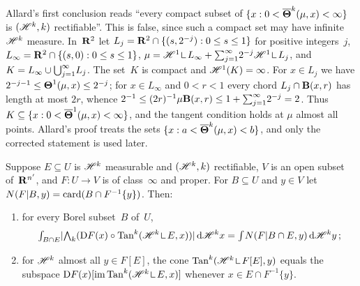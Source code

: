 \begin{remark}
    \label{rem:2.8(5)}
    Allard's first conclusion reads ``every compact subset of $\{ x : 0 < \boldsymbol{\overline{\Theta}}^{k}(\mu,x)
    < \infty \}$ is $(\mathscr{H}^{k},k)$ rectifiable''. This is false, since such a compact set
    may have infinite $\mathscr{H}^{k}$ measure. In~$\mathbf{R}^2$ let $L_j = \mathbf{R}^2 \cap \{ (s, 2^{-j}) : 0
    \le s \le 1 \}$ for positive integers~$j$, $L_\infty = \mathbf{R}^2 \cap \{ (s,0) : 0 \le s \le 1 \}$,
    $\mu = \HM^1 \restrict L_\infty + \textsum{j=1}{\infty} 2^{-j} \HM^1 \restrict L_j$, and $K =
    L_\infty \cup {{\textstyle \bigcup}}_{j=1}^\infty L_j$. The set~$K$ is compact and $\mathscr{H}^1(K) = \infty$. For
    $x \in L_j$ we have $2^{-j-1} \le \boldsymbol{\Theta}^1(\mu,x) \le 2^{-j}$; for $x \in L_\infty$ and
    $0 < r < 1$ every chord $L_j \cap \mathbf{B}(x,r)$ has length at most $2r$, whence $2^{-1} \le
    (2r)^{-1} \mu \mathbf{B}(x,r) \le 1 + {\textstyle\sum_{j=1}^{\infty}} 2^{-j} = 2$. Thus $K \subseteq \{
    x : 0 < \boldsymbol{\overline{\Theta}}^1(\mu,x) < \infty \}$, and the tangent condition holds at $\mu$ almost
    all points. Allard's proof treats the sets $\{ x : a < \boldsymbol{\overline{\Theta}}^{k}(\mu,x) < b \}$, and
    only the corrected statement is used later.
\end{remark}

\begin{lemma}
    \label{al:2.8(6)}
    Suppose $E \subseteq U$ is $\mathscr{H}^{k}$ measurable and $(\mathscr{H}^{k},k)$ rectifiable, $V$
    is an open subset of~$\mathbf{R}^{n'}$, and $F : U \to V$ is of class~$\infty$ and proper. For $B
    \subseteq U$ and $y \in V$ let $N(F|B,y) = \operatorname{card}(B \cap F^{-1}\{y\})$. Then:
    \begin{enumerate}
        \item for every Borel subset~$B$ of~$U$,
            \begin{displaymath}
                \textint{B \cap E}{} |\extpower{\vdim}(\uD F(x) \circ \Tan^{\vdim}(\HM^{\vdim}
                \restrict E, x))| \ud \HM^{\vdim} x = \textint{}{} N(F|B \cap E, y) \ud
                \HM^{\vdim} y \,;
            \end{displaymath}
        \item for $\mathscr{H}^{k}$ almost all $y \in F[E]$, the cone $\Tan^{\vdim}(\HM^{\vdim} \restrict
            F[E], y)$ equals the subspace $\uD F(x)[\im \Tan^{\vdim}(\HM^{\vdim} \restrict E,
            x)]$ whenever $x \in E \cap F^{-1}\{y\}$.
    \end{enumerate}
\end{lemma}

